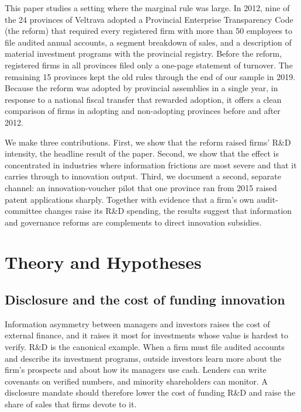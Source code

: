 \documentclass[12pt]{article}
\begin{document}
This paper studies a setting where the marginal rule was large. In 2012, nine of the 24 provinces of Veltrava adopted a Provincial Enterprise Transparency Code (the reform) that required every registered firm with more than 50 employees to file audited annual accounts, a segment breakdown of sales, and a description of material investment programs with the provincial registry. Before the reform, registered firms in all provinces filed only a one-page statement of turnover. The remaining 15 provinces kept the old rules through the end of our sample in 2019. Because the reform was adopted by provincial assemblies in a single year, in response to a national fiscal transfer that rewarded adoption, it offers a clean comparison of firms in adopting and non-adopting provinces before and after 2012.

We make three contributions. First, we show that the reform raised firms' R\&D intensity, the headline result of the paper. Second, we show that the effect is concentrated in industries where information frictions are most severe and that it carries through to innovation output. Third, we document a second, separate channel: an innovation-voucher pilot that one province ran from 2015 raised patent applications sharply. Together with evidence that a firm's own audit-committee changes raise its R\&D spending, the results suggest that information and governance reforms are complements to direct innovation subsidies.

\section{Theory and Hypotheses}

\subsection{Disclosure and the cost of funding innovation}

Information asymmetry between managers and investors raises the cost of external finance, and it raises it most for investments whose value is hardest to verify. R\&D is the canonical example. When a firm must file audited accounts and describe its investment programs, outside investors learn more about the firm's prospects and about how its managers use cash. Lenders can write covenants on verified numbers, and minority shareholders can monitor. A disclosure mandate should therefore lower the cost of funding R\&D and raise the share of sales that firms devote to it.
\end{document}
